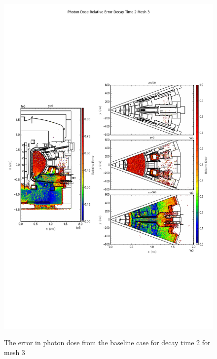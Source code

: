 \begin{figure}[ht!]
\centering
\includegraphics[trim={0cm 9cm 0cm 10cm},clip,scale=0.75]{../plots/final_model/Photon_Dose_Relative_Error_Decay_Time_2_Mesh_3.png}
\label{fig:photons_dc2_no4bc_m3_error}
\caption{The error in photon dose from the baseline case for decay time 2 for mesh 3}
\end{figure}
